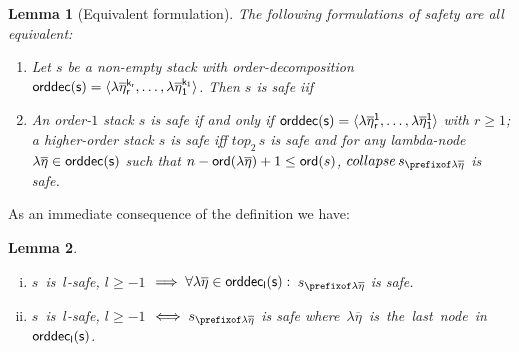 \documentclass[a4paper]{article}
\newtheorem{lemma}{Lemma}[section]
\theoremstyle{remark}
\theoremstyle{definition}
\newcommand\orddec{\sf orddec}
\begin{document}
\begin{lemma}[Equivalent formulation]
The following formulations of safety are all equivalent:
\begin{enumerate}
\item Let $s$ be a non-empty stack with order-decomposition
$\orddec(s)= \langle \lambda \overline\eta_r^{k_r}, \ldots ,
    \lambda \overline{\eta}_1^{k_1} \rangle$.
Then $s$ is safe iif

\item An order-$1$ stack $s$ is safe if and only if $\orddec(s) = \langle \lambda \overline{\eta}_r^1, \ldots , \lambda \overline{\eta}_1^1 \rangle$ with $r\geq 1$;
a higher-order stack $s$ is safe iff $top_2\,s$ is safe and
for any lambda-node $\lambda\overline\eta \in \orddec(s)$ such that $n-{\sf ord}(\lambda \overline{\eta})+1 \leq {\sf ord}(s)$, $collapse\, s_{\prefixof\lambda\overline\eta}$ is safe.

\end{enumerate}

\end{lemma}




As an immediate consequence of the definition we have:
\begin{lemma}
\label{lem:safe_imp_incprefixsafe}
\begin{enumerate}[(i)]
\item
  \mbox{$s$ is $l$-safe}, $l\geq -1$ $\implies \forall \lambda\overline\eta \in \orddec_l(s) :$ $s_{\prefixof \lambda\overline\eta}$ is safe.

\item
  \mbox{$s$ is $l$-safe}, $l\geq -1$ $\iff s_{\prefixof \lambda\overline\eta}$ is safe \mbox{where $\lambda\overline\eta$ is the last node in $\orddec_l(s)$.}
\end{enumerate}
\end{lemma}
\end{document}
